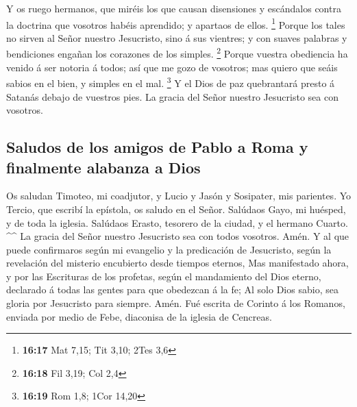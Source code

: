  Y os ruego hermanos, que miréis los que causan disensiones
y escándalos contra la doctrina que vosotros habéis aprendido; y
apartaos de ellos. \footnote{\textbf{16:17} Mat 7,15; Tit 3,10; 2Tes 3,6}
 Porque los tales no sirven al Señor nuestro Jesucristo,
sino á sus vientres; y con suaves palabras y bendiciones engañan los
corazones de los simples. \footnote{\textbf{16:18} Fil 3,19; Col 2,4}
 Porque vuestra obediencia ha venido á ser notoria á todos;
así que me gozo de vosotros; mas quiero que seáis sabios en el bien, y
simples en el mal. \footnote{\textbf{16:19} Rom 1,8; 1Cor 14,20}
 Y el Dios de paz quebrantará presto á Satanás debajo de
vuestros pies. La gracia del Señor nuestro Jesucristo sea con vosotros.

\hypertarget{saludos-de-los-amigos-de-pablo-a-roma-y-finalmente-alabanza-a-dios}{%
\subsection{Saludos de los amigos de Pablo a Roma y finalmente alabanza
a
Dios}\label{saludos-de-los-amigos-de-pablo-a-roma-y-finalmente-alabanza-a-dios}}

 Os saludan Timoteo, mi coadjutor, y Lucio y Jasón y
Sosipater, mis parientes.  Yo Tercio, que escribí la
epístola, os saludo en el Señor.  Salúdaos Gayo, mi
huésped, y de toda la iglesia. Salúdaos Erasto, tesorero de la ciudad, y
el hermano Cuarto. \^{}\^{}  La gracia del Señor nuestro
Jesucristo sea con todos vosotros. Amén.  Y al que puede
confirmaros según mi evangelio y la predicación de Jesucristo, según la
revelación del misterio encubierto desde tiempos eternos, 
Mas manifestado ahora, y por las Escrituras de los profetas, según el
mandamiento del Dios eterno, declarado á todas las gentes para que
obedezcan á la fe;  Al solo Dios sabio, sea gloria por
Jesucristo para siempre. Amén. Fué escrita de Corinto á los Romanos,
enviada por medio de Febe, diaconisa de la iglesia de Cencreas.
